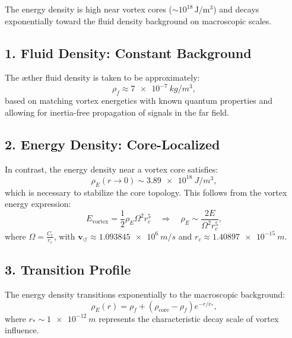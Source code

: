 \documentclass[preprint]{revtex4-2}
\begin{document}
The energy density is high near vortex cores (\(\sim 10^{18}\, \mathrm{J/m^3}\)) and decays exponentially toward the fluid density background on
macroscopic scales.


\subsection*{1. Fluid Density: Constant Background}

The æther fluid density is taken to be approximately:
\begin{equation}
    \rho_{\scriptscriptstyle\boldsymbol\!f} \approx \SI{7e-7}{kg/m^3},
\end{equation}
based on matching vortex energetics with known quantum properties and allowing for inertia-free propagation of signals in the far field.

\subsection*{2. Energy Density: Core-Localized}

In contrast, the energy density near a vortex core satisfies:
\begin{equation}
    \rho_{\scriptscriptstyle\boldsymbol\!E}(r \to 0) \sim \SI{3.89e18}{J/m^3},
\end{equation}
which is necessary to stabilize the core topology. This follows from the vortex energy expression:
\begin{equation}
    E_{\text{vortex}} = \frac{1}{2} \rho_{\scriptscriptstyle\boldsymbol\!E} \Omega^2 r_c^5
    \quad\Rightarrow\quad
    \rho_{\scriptscriptstyle\boldsymbol\!E} \sim \frac{2E}{\Omega^2 r_c^5},
\end{equation}
where \( \Omega = \frac{C_e}{r_c} \), with \( \mathbf{v}_{\scriptscriptstyle\boldsymbol{\circlearrowleft}} \approx \SI{1.093845e6}{m/s} \) and \( r_c \approx \SI{1.40897e-15}{m} \).

\subsection*{3. Transition Profile}

The energy density transitions exponentially to the macroscopic background:
\begin{equation}
    \rho_{\scriptscriptstyle\boldsymbol\!E}(r) =
    \rho_{\scriptscriptstyle\boldsymbol\!f} +
    \left(\rho_{\text{core}} - \rho_{\scriptscriptstyle\boldsymbol\!f}\right)
    e^{-r/r_*},
\end{equation}
where \( r_* \sim \SI{1e-12}{m} \) represents the characteristic decay scale of vortex influence.
\end{document}
